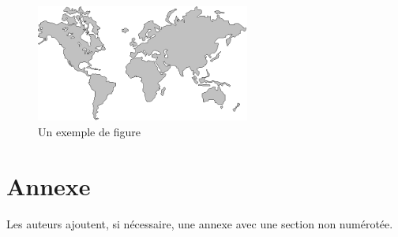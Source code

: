 \documentclass{jres}
\begin{document}
\begin{figure}
\centerline{\includegraphics[width=7cm]{figure}}
\caption{Un exemple de figure}
\label{fig-exemple}
\end{figure}


\section*{Annexe}

Les auteurs ajoutent, si nécessaire, une annexe avec une section non numérotée.

\nocite{*}

\end{document}
